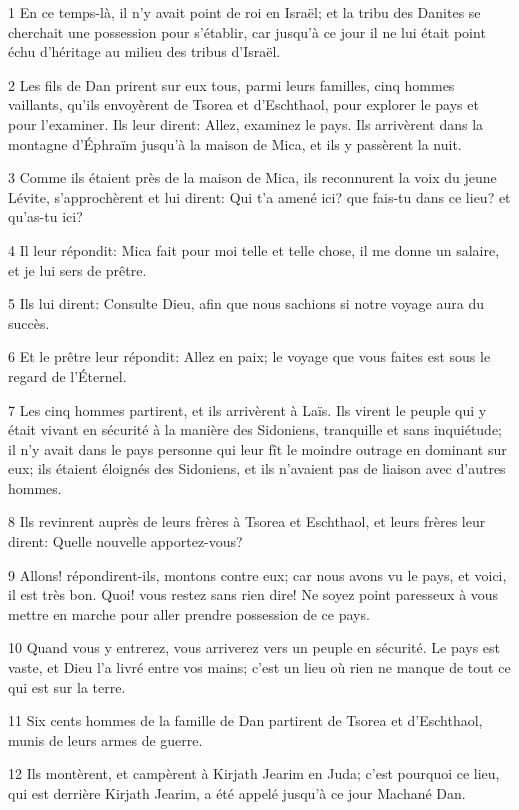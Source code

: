 \par 1 En ce temps-là, il n'y avait point de roi en Israël; et la tribu des Danites se cherchait une possession pour s'établir, car jusqu'à ce jour il ne lui était point échu d'héritage au milieu des tribus d'Israël.
\par 2 Les fils de Dan prirent sur eux tous, parmi leurs familles, cinq hommes vaillants, qu'ils envoyèrent de Tsorea et d'Eschthaol, pour explorer le pays et pour l'examiner. Ils leur dirent: Allez, examinez le pays. Ils arrivèrent dans la montagne d'Éphraïm jusqu'à la maison de Mica, et ils y passèrent la nuit.
\par 3 Comme ils étaient près de la maison de Mica, ils reconnurent la voix du jeune Lévite, s'approchèrent et lui dirent: Qui t'a amené ici? que fais-tu dans ce lieu? et qu'as-tu ici?
\par 4 Il leur répondit: Mica fait pour moi telle et telle chose, il me donne un salaire, et je lui sers de prêtre.
\par 5 Ils lui dirent: Consulte Dieu, afin que nous sachions si notre voyage aura du succès.
\par 6 Et le prêtre leur répondit: Allez en paix; le voyage que vous faites est sous le regard de l'Éternel.
\par 7 Les cinq hommes partirent, et ils arrivèrent à Laïs. Ils virent le peuple qui y était vivant en sécurité à la manière des Sidoniens, tranquille et sans inquiétude; il n'y avait dans le pays personne qui leur fît le moindre outrage en dominant sur eux; ils étaient éloignés des Sidoniens, et ils n'avaient pas de liaison avec d'autres hommes.
\par 8 Ils revinrent auprès de leurs frères à Tsorea et Eschthaol, et leurs frères leur dirent: Quelle nouvelle apportez-vous?
\par 9 Allons! répondirent-ils, montons contre eux; car nous avons vu le pays, et voici, il est très bon. Quoi! vous restez sans rien dire! Ne soyez point paresseux à vous mettre en marche pour aller prendre possession de ce pays.
\par 10 Quand vous y entrerez, vous arriverez vers un peuple en sécurité. Le pays est vaste, et Dieu l'a livré entre vos mains; c'est un lieu où rien ne manque de tout ce qui est sur la terre.
\par 11 Six cents hommes de la famille de Dan partirent de Tsorea et d'Eschthaol, munis de leurs armes de guerre.
\par 12 Ils montèrent, et campèrent à Kirjath Jearim en Juda; c'est pourquoi ce lieu, qui est derrière Kirjath Jearim, a été appelé jusqu'à ce jour Machané Dan.
